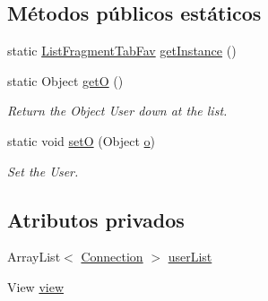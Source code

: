 \subsection*{Métodos públicos estáticos}
\begin{DoxyCompactItemize}
\item 
static \hyperlink{classes_1_1ucm_1_1tfg_1_1controlremotolinux_1_1client_1_1controller_1_1ListFragmentTabFav}{List\-Fragment\-Tab\-Fav} \hyperlink{classes_1_1ucm_1_1tfg_1_1controlremotolinux_1_1client_1_1controller_1_1ListFragmentTabFav_a53952406ff2cd0bb111360207aeb9e75}{get\-Instance} ()
\item 
static Object \hyperlink{classes_1_1ucm_1_1tfg_1_1controlremotolinux_1_1client_1_1controller_1_1ListFragmentTabFav_a450c818465a09a3924571e3d1973f04b}{get\-O} ()
\begin{DoxyCompactList}\small\item\em Return the Object User down at the list. \end{DoxyCompactList}\item 
static void \hyperlink{classes_1_1ucm_1_1tfg_1_1controlremotolinux_1_1client_1_1controller_1_1ListFragmentTabFav_a4bb6cfe5fa5e5bd89f52726b90916ad7}{set\-O} (Object \hyperlink{classes_1_1ucm_1_1tfg_1_1controlremotolinux_1_1client_1_1controller_1_1ListFragmentTabFav_a5c6595de9f82e8ff365021392309eb53}{o})
\begin{DoxyCompactList}\small\item\em Set the User. \end{DoxyCompactList}\end{DoxyCompactItemize}
\subsection*{Atributos privados}
\begin{DoxyCompactItemize}
\item 
Array\-List$<$ \hyperlink{classes_1_1ucm_1_1tfg_1_1controlremotolinux_1_1client_1_1model_1_1sql_1_1Connection}{Connection} $>$ \hyperlink{classes_1_1ucm_1_1tfg_1_1controlremotolinux_1_1client_1_1controller_1_1ListFragmentTabFav_a6cb5aca93a7ccbca55d49a64794817e6}{user\-List}
\item 
View \hyperlink{classes_1_1ucm_1_1tfg_1_1controlremotolinux_1_1client_1_1controller_1_1ListFragmentTabFav_a3950d582ad9294240404e931f556ed64}{view}
\end{DoxyCompactItemize}
